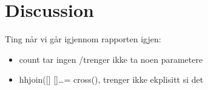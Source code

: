 \chapter{Discussion}
\label{chapter:discussion}

Ting n\aa r vi g\aa r igjennom rapporten igjen:
\begin{itemize}
  \item count tar ingen /trenger ikke ta noen parametere
  \item hhjoin([] []\ldots = cross(), trenger ikke ekplisitt si det
\end{itemize}












